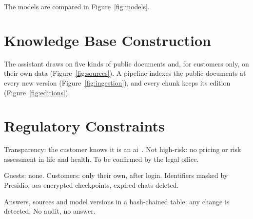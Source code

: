 The models are compared in Figure~\ref{fig:models}.



\section{Knowledge Base Construction}
\label{sec:knowledge-base}

The assistant draws on five kinds of public documents and, for customers only, on their own data
(Figure~\ref{fig:sources}). A pipeline indexes the public documents at every new version
(Figure~\ref{fig:ingestion}), and every chunk keeps its edition (Figure~\ref{fig:editions}).




\section{Regulatory Constraints}
\label{sec:constraints}

\begin{tcbraster}[raster columns=3, cardgrid]
  \begin{tcolorbox}[card]
    Transparency: the customer knows it is an \ac{ai}~\cite{euaiact2024}. Not high-risk: no
    pricing or risk assessment in life and health.
    \tcblower
    To be confirmed by the legal office.
  \end{tcolorbox}
  \begin{tcolorbox}[card]
    Guests: none. Customers: only their own, after login.
    \tcblower
    Identifiers masked by Presidio, \acs{aes}-encrypted checkpoints, expired chats deleted.
  \end{tcolorbox}
  \begin{tcolorbox}[card]
    Answers, sources and model versions in a hash-chained table: any change is detected.
    \tcblower
    No audit, no answer.
  \end{tcolorbox}
\end{tcbraster}
